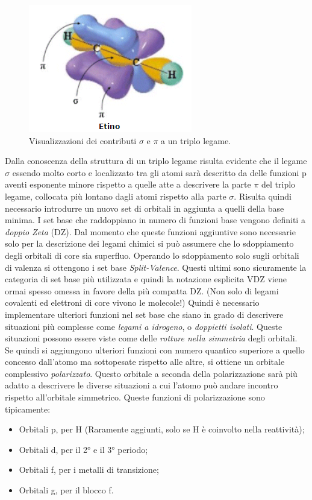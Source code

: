 \documentclass[oneside]{amsbook}
\numberwithin{section}{chapter}
\numberwithin{equation}{section}
\numberwithin{figure}{section}
\begin{document}
\begin{figure}[H]
\centering
\caption{Visualizzazioni dei contributi $\sigma$ e $\pi$ a un triplo legame.}\label{o}
\includegraphics[scale=0.6]{trip}
\end{figure}

Dalla conoscenza della struttura di un triplo legame risulta evidente che il legame $\sigma$ essendo molto corto e localizzato tra gli atomi sarà descritto da delle funzioni p aventi esponente minore rispetto a quelle atte a descrivere la parte $\pi$ del triplo legame, collocata più lontano dagli atomi rispetto alla parte $\sigma$.
Risulta  quindi necessario introdurre un nuovo set di orbitali in aggiunta a quelli della base minima. I set base che raddoppiano in numero di funzioni base vengono definiti a \emph{doppio Zeta} (DZ). Dal momento che queste funzioni aggiuntive sono necessarie solo per la descrizione dei legami chimici si può assumere che lo sdoppiamento degli orbitali di core sia superfluo. Operando lo sdoppiamento solo sugli orbitali di valenza si ottengono i set base \emph{Split-Valence}. Questi ultimi sono sicuramente la categoria di set base più utilizzata e quindi la notazione esplicita VDZ viene ormai spesso omessa in favore della più compatta DZ.
(Non solo di legami covalenti ed elettroni di core vivono le molecole!) Quindi è necessario implementare ulteriori funzioni nel set base che siano in grado di descrivere situazioni più complesse come \emph{legami a idrogeno}, o \emph{doppietti isolati}. Queste situazioni possono essere viste come delle \emph{rotture nella simmetria} degli orbitali. Se quindi si aggiungono ulteriori funzioni con numero quantico superiore a quello concesso dall'atomo ma sottopesate rispetto alle altre, si ottiene un orbitale complessivo \emph{polarizzato}. Questo orbitale a seconda della polarizzazione sarà più adatto a descrivere le diverse situazioni a cui l'atomo può andare incontro rispetto all'orbitale simmetrico. Queste funzioni di polarizzazione sono tipicamente:
\begin{itemize}
\item Orbitali p, per H (Raramente aggiunti, solo se H è coinvolto nella reattività);
\item Orbitali d, per il 2° e il 3° periodo;
\item Orbitali f, per i metalli di transizione;
\item Orbitali g, per il blocco f.
\end{itemize}
\end{document}
